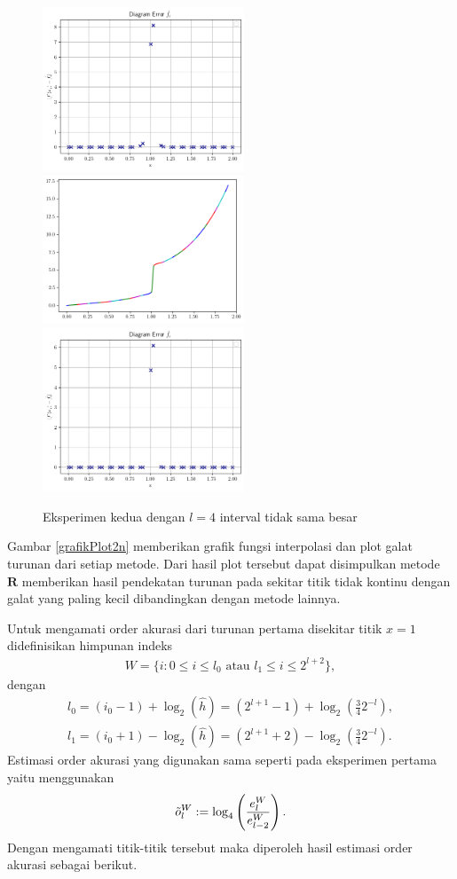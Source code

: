 \begin{figure}[H]
    \includegraphics[width=6cm]{Images/figure_2/plotRFB2n.png}
    \\
    \includegraphics[width=6cm]{Images/figure_2/grafikRAY2n.png}
    \includegraphics[width=6cm]{Images/figure_2/plotRAY2n.png}
    \caption{Eksperimen kedua dengan $l=4$ interval tidak sama besar}
    \label{grafikPlot2n}
\end{figure}

Gambar \eqref{grafikPlot2n} memberikan grafik fungsi interpolasi dan plot galat turunan dari setiap metode. Dari hasil plot tersebut dapat disimpulkan metode $\textbf{R}$ memberikan hasil pendekatan turunan pada sekitar titik tidak kontinu dengan galat yang paling kecil dibandingkan dengan metode lainnya.

Untuk mengamati order akurasi dari turunan pertama disekitar titik $x=1$ didefinisikan himpunan indeks
\begin{align*}
    W = \{ i: 0 \leq i \leq l_0 \text{ atau } l_1 \leq i \leq 2^{l+2} \},
\end{align*}
dengan
\begin{align*}
    l_0 = (i_0 - 1) + \log_2(\hat{h}) = (2^{l+1} - 1) + \log_2\left(\frac{3}{4} 2^{-l}\right), \\
    l_1 = (i_0 + 1) - \log_2(\hat{h}) = (2^{l+1} + 2) - \log_2\left(\frac{3}{4} 2^{-l}\right).
\end{align*}
Estimasi order akurasi yang digunakan sama seperti pada eksperimen pertama yaitu menggunakan
\begin{align*}
    \Tilde{o}_l^W := \log_4\left(\frac{e_{l}^W}{e_{l-2}^W}\right).
\end{align*}
Dengan mengamati titik-titik tersebut maka diperoleh hasil estimasi order akurasi sebagai berikut.

